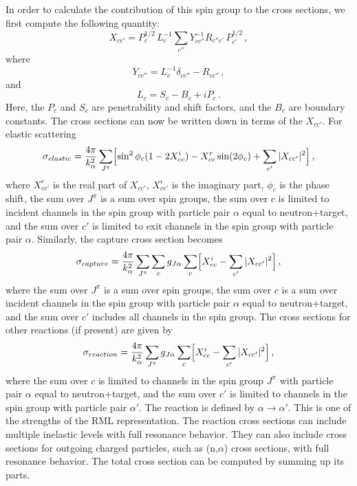 In order to calculate the contribution of this spin group to the
cross sections, we first compute the following quantity:
\begin{equation}
  X_{cc'}=P_c^{1/2}\,L_c^{-1} \sum_{c''} Y_{cc''}^{-1}
      R_{c''c'}\,P_{c'}^{1/2} \,,
\label{xmtx}
\end{equation}
where
\begin{equation}
  Y_{cc''}=L_c^{-1}\delta_{cc''}-R_{cc''} \,,
\end{equation}
and
\begin{equation}
  L_c=S_c-B_c+iP_c \,.
\end{equation}
Here, the $P_c$ and $S_c$ are penetrability and shift factors, and the $B_c$ are
boundary constants.  The cross sections can now be written down
in terms of the $X_{cc'}$.  For elastic scattering
\begin{equation}
  \sigma_{elastic}=\frac{4\pi}{k_\alpha^2}\sum_{J^\pi}
  \Bigl[\sin^2\phi_c(1-2X_{cc}^i) \nonumber\\
   -X_{cc}^r\sin(2\phi_c)
    +\sum_{c'}|X_{cc'}|^2\Bigr] \,,
\end{equation}
where $X_{cc'}^r$ is the real part of $X_{cc'}$, $X_{cc'}^i$ is
the imaginary part, $\phi_c$ is the phase shift, the sum over
$J^\pi$ is a sum over spin groups, the sum over $c$ is limited to
incident channels in the spin group with particle pair $\alpha$
equal to neutron+target, and the sum over $c'$ is limited to
exit channels in the spin group with particle pair $\alpha$.
Similarly, the capture cross section becomes
\begin{equation}
  \sigma_{capture}=\frac{4\pi}{k_\alpha^2}\sum_{J^\pi}
     \sum_c g_{J\alpha}\sum_c\Bigl[X_{cc}^i
   -\sum_{c'}|X_{cc'}|^2\Bigr] \,,
\end{equation}
where the sum over $J^\pi$ is a sum over spin groups, the sum over
$c$ is a sum over incident channels in the spin group with
particle pair $\alpha$ equal to neutron+target, and the sum
over $c'$ includes all channels in the spin group.  The cross
sections for other reactions (if present) are given by
\begin{equation}
  \sigma_{reaction}=\frac{4\pi}{k_\alpha^2}\sum_{J^\pi}
   g_{J\alpha}\sum_c\Bigl[X_{cc}^i-\sum_{c'} |X_{cc'}|^2\Bigr] \,,
\end{equation}
where the sum over $c$ is limited to channels in the spin group
$J^\pi$ with particle pair $\alpha$ equal to neutron+target, and
the sum over $c'$ is limited to channels in the spin group with
particle pair $\alpha'$.  The reaction is defined by
$\alpha\rightarrow\alpha'$.  This is one of the strengths
of the RML representation.  The reaction cross sections can
include multiple inelastic levels with full resonance behavior.
They can also include cross sections for outgoing charged particles,
such as (n,$\alpha$) cross sections, with full resonance
behavior.  The total cross section can be computed by summing
up its parts.


